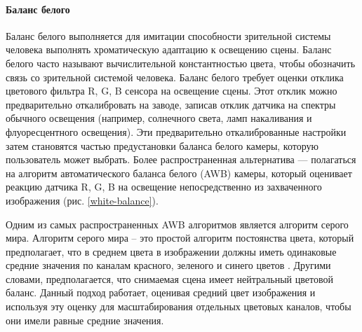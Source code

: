 \paragraph{Баланс белого}

Баланс белого выполняется для имитации способности зрительной системы человека выполнять хроматическую адаптацию к освещению сцены. Баланс белого часто называют вычислительной константностью цвета, чтобы обозначить связь со зрительной системой человека. Баланс белого
требует оценки отклика цветового фильтра R, G, B сенсора на освещение сцены. Этот отклик можно предварительно откалибровать на заводе, записав отклик датчика на спектры обычного освещения (например, солнечного света, ламп накаливания и флуоресцентного освещения). Эти предварительно откалиброванные настройки затем становятся частью предустановки баланса белого камеры, которую пользователь может выбрать. Более распространенная альтернатива — полагаться на алгоритм автоматического баланса белого (AWB) камеры, который оценивает реакцию датчика R, G, B на освещение непосредственно из захваченного изображения (рис. \ref{white-balance}).



Одним из самых распространенных AWB алгоритмов является алгоритм серого мира. Алгоритм серого мира -- это простой алгоритм постоянства цвета, который предполагает, что в среднем цвета в изображении должны иметь одинаковые средние значения по каналам красного, зеленого и синего цветов \cite{lib-gray-world}. Другими словами, предполагается, что снимаемая сцена имеет нейтральный цветовой баланс. Данный подход работает, оценивая средний цвет изображения и используя эту оценку для масштабирования отдельных цветовых каналов, чтобы они имели равные средние значения.